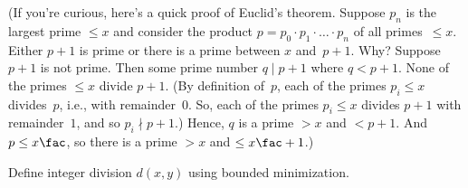 \documentclass[../../../include/open-logic-section]{subfiles}
\begin{document}
(If you're curious, here's a quick proof of Euclid's theorem. Suppose
$p_n$ is the largest prime $\le x$ and consider the product $p =
p_0\cdot p_1 \cdot \dots \cdot p_n$ of all primes~$\le x$. Either
$p+1$ is prime or there is a prime between $x$ and~$p+1$.  Why?
Suppose $p+1$ is not prime. Then some prime number $q \mid p+1$ where
$q < p+1$. None of the primes $\le x$ divide $p+1$. (By definition
of~$p$, each of the primes $p_i \le x$ divides~$p$, i.e., with
remainder~$0$. So, each of the primes $p_i \le x$ divides $p+1$ with
remainder~$1$, and so $p_i \nmid p+1$.)  Hence, $q$ is a prime $>
x$ and $< p+1$.  And $p \le x\fac$, so there is a prime $> x$ and $\le
x\fac+1$.)

\begin{prob}
Define integer division $d(x, y)$ using bounded minimization.
\end{prob}
\end{document}
